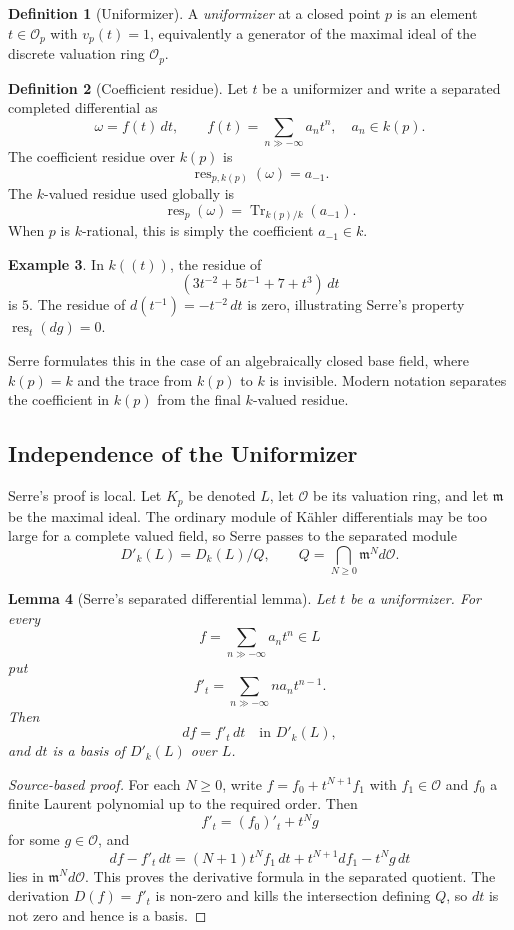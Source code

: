 \documentclass[11pt,a4paper]{article}
\newcommand{\OO}{\mathcal O}
\newcommand{\res}{\operatorname{res}}
\newcommand{\Tr}{\operatorname{Tr}}
\theoremstyle{definition}
\newtheorem{definition}{Definition}[section]
\newtheorem{example}[definition]{Example}
\theoremstyle{plain}
\newtheorem{lemma}[definition]{Lemma}
\theoremstyle{remark}
\begin{document}
\begin{definition}[Uniformizer]
A \emph{uniformizer} at a closed point $p$ is an element $t\in\OO_p$ with $v_p(t)=1$, equivalently a generator of the maximal ideal of the discrete valuation ring $\OO_p$.
\end{definition}

\begin{definition}[Coefficient residue]
Let $t$ be a uniformizer and write a separated completed differential as
\[
  \omega=f(t)\,dt,
  \qquad
  f(t)=\sum_{n\gg -\infty} a_n t^n,
  \quad a_n\in k(p).
\]
The coefficient residue over $k(p)$ is
\[
  \res_{p,k(p)}(\omega)=a_{-1}.
\]
The $k$-valued residue used globally is
\[
  \res_p(\omega)=\Tr_{k(p)/k}(a_{-1}).
\]
When $p$ is $k$-rational, this is simply the coefficient $a_{-1}\in k$.
\end{definition}

\begin{example}
In $k((t))$, the residue of
\[
  (3t^{-2}+5t^{-1}+7+t^3)\,dt
\]
is $5$.  The residue of $d(t^{-1})=-t^{-2}\,dt$ is zero, illustrating Serre's property $\res_t(dg)=0$.
\end{example}

Serre formulates this in the case of an algebraically closed base field, where $k(p)=k$ and the trace from $k(p)$ to $k$ is invisible.  Modern notation separates the coefficient in $k(p)$ from the final $k$-valued residue.

\subsection{Independence of the Uniformizer}

Serre's proof is local.  Let $K_p$ be denoted $L$, let $\OO$ be its valuation ring, and let $\mathfrak m$ be the maximal ideal.  The ordinary module of Kähler differentials may be too large for a complete valued field, so Serre passes to the separated module
\[
  D'_k(L)=D_k(L)/Q,
  \qquad
  Q=\bigcap_{N\ge 0}\mathfrak m^N d\OO.
\]

\begin{lemma}[Serre's separated differential lemma]
Let $t$ be a uniformizer.  For every
\[
  f=\sum_{n\gg -\infty}a_n t^n\in L
\]
put
\[
  f'_t=\sum_{n\gg -\infty} n a_n t^{n-1}.
\]
Then
\[
  df=f'_t\,dt\quad\text{in }D'_k(L),
\]
and $dt$ is a basis of $D'_k(L)$ over $L$.
\end{lemma}

\begin{proof}[Source-based proof]
For each $N\ge 0$, write $f=f_0+t^{N+1}f_1$ with $f_1\in\OO$ and $f_0$ a finite Laurent polynomial up to the required order.  Then
\[
  f'_t=(f_0)'_t+t^Ng
\]
for some $g\in\OO$, and
\[
  df-f'_t\,dt=(N+1)t^Nf_1\,dt+t^{N+1}df_1-t^Ng\,dt
\]
lies in $\mathfrak m^Nd\OO$.  This proves the derivative formula in the separated quotient.  The derivation $D(f)=f'_t$ is non-zero and kills the intersection defining $Q$, so $dt$ is not zero and hence is a basis.
\end{proof}
\end{document}
